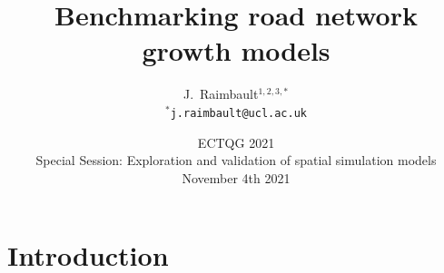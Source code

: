 






\title[Benchmarking road network growth models]{Benchmarking road network growth models}

\author[Raimbault]{J.~Raimbault$^{1,2,3,\ast}$\\\medskip
$^{\ast}$\texttt{j.raimbault@ucl.ac.uk}
}



\date[04/11/2021]{ECTQG 2021\\
Special Session: Exploration and validation of spatial simulation models\\
November 4th 2021
}

\frame{\maketitle}



\section{Introduction}

